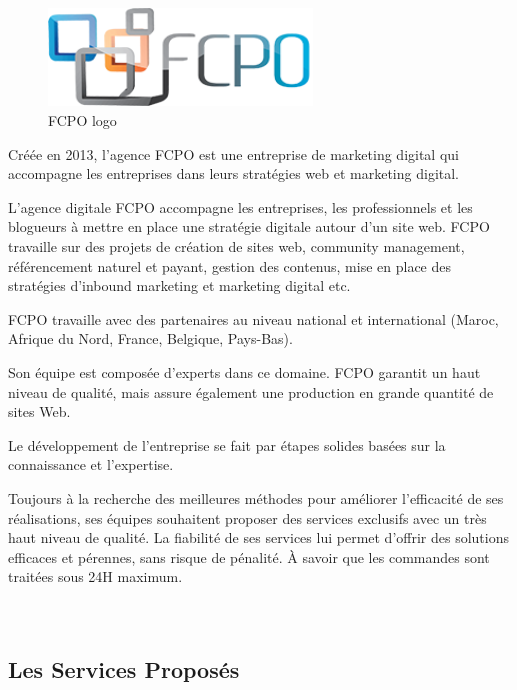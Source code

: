\begin{figure}[H] 
    \centering
    \includegraphics[width=7cm]{Logos/fcpo.png}
    \caption{FCPO logo}
\end{figure}

\hspace{16pt}Créée en 2013, l'agence FCPO est une entreprise de marketing digital qui
accompagne les entreprises dans leurs stratégies web et marketing digital.

\vspace{12pt}
L’agence digitale FCPO accompagne les entreprises, les professionnels et les
blogueurs à mettre en place une stratégie digitale autour d’un site web. FCPO
travaille sur des projets de création de sites web, community management,
référencement naturel et payant, gestion des contenus, mise en place des
stratégies d’inbound marketing et marketing digital etc.

\vspace{12pt}
FCPO travaille avec des partenaires au niveau national et international
(Maroc, Afrique du Nord, France, Belgique, Pays-Bas).

\vspace{12pt}
Son équipe est composée d'experts dans ce domaine. FCPO garantit un haut
niveau de qualité, mais assure également une production en grande quantité
de sites Web.

\vspace{12pt}
Le développement de l'entreprise se fait par étapes solides basées sur la
connaissance et l'expertise.

\vspace{12pt}
Toujours à la recherche des meilleures méthodes
pour améliorer l’efficacité de ses réalisations, ses équipes souhaitent proposer
des services exclusifs avec un très haut niveau de qualité. La fiabilité de ses
services lui permet d'offrir des solutions efficaces et pérennes, sans
risque de pénalité. À savoir que les commandes sont traitées sous 24H maximum.\\ \\ \\

\subsection{Les Services Proposés}

